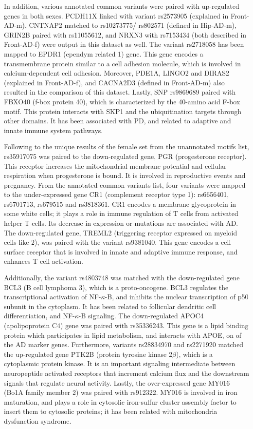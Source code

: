 In addition, various annotated common variants were paired with up-regulated genes in both sexes. PCDH11X linked with variant rs2573905 (explained in Front-AD-m), CNTNAP2 matched to rs10273775/ rs802571 (defined in Hip-AD-m), GRIN2B paired with rs11055612, and NRXN3 with rs7153434 (both described in Front-AD-f) were output in this dataset as well. The variant rs2718058 has been mapped to EPDR1 (ependym related 1) gene. This gene encodes a transmembrane protein similar to a cell adhesion molecule, which is involved in calcium-dependent cell adhesion. Moreover, PDE1A, LINGO2 and DIRAS2 (explained in Front-AD-f), and CACNA2D3 (defined in Front-AD-m) also resulted in the comparison of this dataset. Lastly, SNP rs9869689 paired with FBXO40 (f-box protein 40), which is characterized by the 40-amino acid F-box motif. This protein interacts with SKP1 and the ubiquitination targets through other domains. It has been associated with PD, and related to adaptive and innate immune system pathways.

Following to the unique results of the female set from the unannotated motifs list, rs35917075 was paired to the down-regulated gene, PGR (progesterone receptor). This receptor increases the mitochondrial membrane potential and cellular respiration when progesterone is bound. It is involved in reproductive events and pregnancy. From the annotated common variants list, four variants were mapped to the under-expressed gene CR1 (complement receptor type 1): rs6656401, rs6701713, rs679515 and rs3818361. CR1 encodes a membrane glycoprotein in some white cells; it plays a role in immune regulation of T cells from activated helper T cells. Its decrease in expression or mutations are associated with AD. The down-regulated gene, TREML2 (triggering receptor expressed on myeloid cells-like 2), was paired with the variant rs9381040. This gene encodes a cell surface receptor that is involved in innate and adaptive immune response, and enhances T cell activation.

Additionally, the variant rs4803748 was matched with the down-regulated gene BCL3 (B cell lymphoma 3), which is a proto-oncogene. BCL3 regulates the transcriptional activation of NF-$\kappa$-B, and inhibits the nuclear transcription of p50 subunit in the cytoplasm. It has been related to follicular dendritic cell differentiation, and NF-$\kappa$-B signaling. The down-regulated APOC4 (apolipoprotein C4) gene was paired with rs35336243. This gene is a lipid binding protein which participates in lipid metabolism, and interacts with APOE, on of the AD marker genes. Furthermore, variants rs28834970 and rs2271920 matched the up-regulated gene PTK2B (protein tyrosine kinase 2$\beta$), which is a cytoplasmic protein kinase. It is an important signaling intermediate between neuropeptide activated receptors that increment calcium flux and the downstream signals that regulate neural activity. Lastly, the over-expressed gene MY016 (Bo1A family member 2) was paired with rs912322. MY016 is involved in iron maturation, and plays a role in cytosolic iron-sulfur cluster assembly factor to insert them to cytosolic proteins; it has been related with mitochondria dysfunction syndrome.

